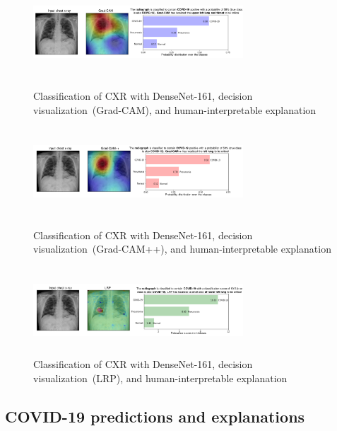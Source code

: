 \documentclass[conference]{IEEEtran}
\begin{document}
\begin{figure}
	\centering
    	\includegraphics[width=0.7\textwidth,height=33mm]{samples/gcam.pdf}
    	\caption{Classification of CXR with DenseNet-161, decision visualization~(Grad-CAM), and human-interpretable explanation}
    	\label{Fig:ggcam_viz}
    	\smallskip
    	\includegraphics[width=0.7\textwidth,height=33mm]{samples/gcampp.pdf}
    	\caption{Classification of CXR with DenseNet-161, decision visualization~(Grad-CAM++), and human-interpretable explanation}
    	\label{Fig:ggcam_plus_viz}
    	\smallskip
    	\includegraphics[width=0.7\textwidth,height=33mm]{samples/lrp.pdf}
    	\caption{Classification of CXR with DenseNet-161, decision visualization~(LRP), and human-interpretable explanation}
    	\label{Fig:lrp_viz}
    	\vspace{-4mm}
\end{figure}

\subsection{COVID-19 predictions and explanations}
\label{sub:expl}
\end{document}
